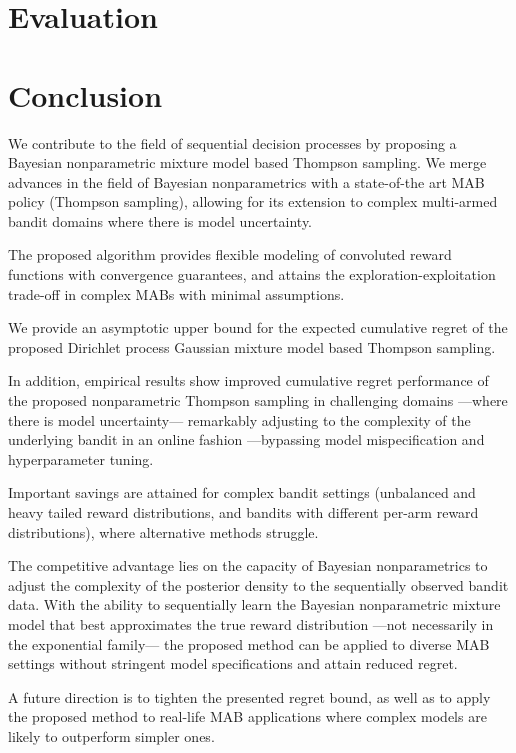 \documentclass{article}
\begin{document}
\section{Evaluation}
\label{sec:evaluation}


\section{Conclusion}
\label{sec:conclusion}

We contribute to the field of sequential decision processes by proposing a Bayesian nonparametric mixture model based Thompson sampling.
We merge advances in the field of Bayesian nonparametrics with a state-of-the art MAB policy (\ie Thompson sampling), allowing for its extension to complex multi-armed bandit domains where there is model uncertainty.

The proposed algorithm provides flexible modeling of convoluted reward functions with convergence guarantees, and attains the exploration-exploitation trade-off in complex MABs with minimal assumptions.

We provide an asymptotic upper bound for the expected cumulative regret of the proposed Dirichlet process Gaussian mixture model based Thompson sampling.

In addition, empirical results show improved cumulative regret performance of the proposed nonparametric Thompson sampling in challenging domains ---where there is model uncertainty--- remarkably adjusting to the complexity of the underlying bandit in an online fashion ---bypassing model mispecification and hyperparameter tuning.

Important savings are attained for complex bandit settings (\eg unbalanced and heavy tailed reward distributions, and bandits with different per-arm reward distributions), where alternative methods struggle.

The competitive advantage lies on the capacity of Bayesian nonparametrics to adjust the complexity of the posterior density to the sequentially observed bandit data.
With the ability to sequentially learn the Bayesian nonparametric mixture model that best approximates the true reward distribution ---not necessarily in the exponential family--- the proposed method can be applied to diverse MAB settings without stringent model specifications and attain reduced regret.

A future direction is to tighten the presented regret bound, as well as to apply the proposed method to real-life MAB applications where complex models are likely to outperform simpler ones.
\end{document}

